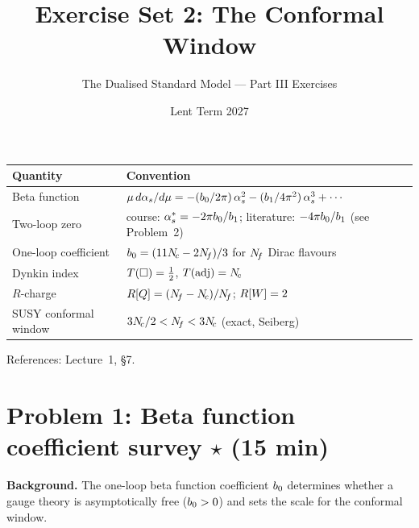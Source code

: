 \documentclass[11pt,a4paper]{article}
\title{\textbf{Exercise Set 2: The Conformal Window}}
\author{The Dualised Standard Model --- Part III Exercises}
\date{Lent Term 2027}
\begin{document}
\maketitle

\begin{conventionbox}[title={Conventions for these exercises}]
\renewcommand{\arraystretch}{1.3}
\begin{tabular}{@{}l l@{}}
\toprule
\textbf{Quantity} & \textbf{Convention} \\
\midrule
Beta function & $\mu\,d\alpha_s/d\mu = -(b_0/2\pi)\,\alpha_s^2
  - (b_1/4\pi^2)\,\alpha_s^3 + \cdots$ \\
Two-loop zero & course: $\alpha_s^* = -2\pi b_0/b_1$;
  literature: $-4\pi b_0/b_1$ (see Problem~2) \\
One-loop coefficient & $b_0 = (11N_{\!c} - 2N_{\!f})/3$ for $N_{\!f}$ Dirac flavours \\
Dynkin index & $T(\square) = \tfrac{1}{2}$, $T(\mathrm{adj}) = N_{\!c}$ \\
$R$-charge & $R[Q] = (N_{\!f} - N_{\!c})/N_{\!f}$; $R[W] = 2$ \\
SUSY conformal window & $3N_{\!c}/2 < N_{\!f} < 3N_{\!c}$ (exact, Seiberg) \\
\bottomrule
\end{tabular}

\medskip

\noindent References: Lecture~1, \S7.
\end{conventionbox}

\bigskip

\section*{Problem 1: Beta function coefficient survey
  \hfill $\star$ \normalsize(15 min)}
\label{prob:b0-survey}

\noindent\textbf{Background.}
The one-loop beta function coefficient $b_0$ determines whether a gauge
theory is asymptotically free ($b_0 > 0$) and sets the scale for the
conformal window.
\end{document}
